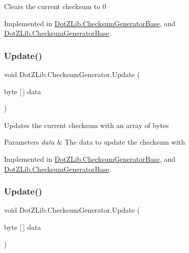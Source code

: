 Clears the current checksum to 0 



Implemented in \hyperlink{class_dot_z_lib_1_1_checksum_generator_base_a78ec9de09223c6f9f81e4a32d8d00b70}{Dot\+Z\+Lib.\+Checksum\+Generator\+Base}, and \hyperlink{class_dot_z_lib_1_1_checksum_generator_base_a78ec9de09223c6f9f81e4a32d8d00b70}{Dot\+Z\+Lib.\+Checksum\+Generator\+Base}.

\mbox{\label{interface_dot_z_lib_1_1_checksum_generator_a10930844922e72671843dd5c97709394}} 
\subsubsection{\texorpdfstring{Update()}{Update()}\hspace{0.1cm}{\footnotesize\ttfamily [1/8]}}
{\footnotesize\ttfamily void Dot\+Z\+Lib.\+Checksum\+Generator.\+Update (\begin{DoxyParamCaption}\item[{byte \mbox{[}$\,$\mbox{]}}]{data }\end{DoxyParamCaption})}



Updates the current checksum with an array of bytes 


\begin{DoxyParams}{Parameters}
{\em data} & The data to update the checksum with\\
\hline
\end{DoxyParams}


Implemented in \hyperlink{class_dot_z_lib_1_1_checksum_generator_base_a3fafe3e0c2fa80fb2cbbdce82a76bc84}{Dot\+Z\+Lib.\+Checksum\+Generator\+Base}, and \hyperlink{class_dot_z_lib_1_1_checksum_generator_base_a3fafe3e0c2fa80fb2cbbdce82a76bc84}{Dot\+Z\+Lib.\+Checksum\+Generator\+Base}.

\mbox{\label{interface_dot_z_lib_1_1_checksum_generator_a10930844922e72671843dd5c97709394}} 
\subsubsection{\texorpdfstring{Update()}{Update()}\hspace{0.1cm}{\footnotesize\ttfamily [2/8]}}
{\footnotesize\ttfamily void Dot\+Z\+Lib.\+Checksum\+Generator.\+Update (\begin{DoxyParamCaption}\item[{byte \mbox{[}$\,$\mbox{]}}]{data }\end{DoxyParamCaption})}




